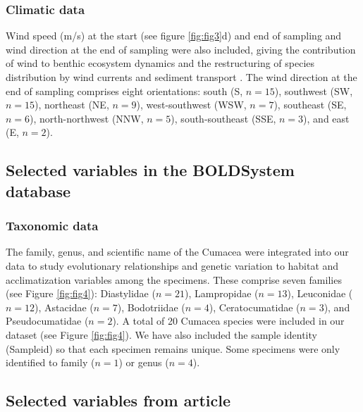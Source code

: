 {\subsubsection{Climatic data}
Wind speed (m/s) at the start (see figure \ref{fig:fig3}d) and end of sampling and wind direction at the end of sampling were also included, giving the contribution of wind to benthic ecosystem dynamics and the restructuring of species distribution by wind currents and sediment transport \citep{siedlecki2016experiments, waga_recent_2020,saeedi_environmental_2022}. The wind direction at the end of sampling comprises eight orientations: south (S, $n=15$), southwest (SW, $n=15$), northeast (NE, $n=9$), west-southwest (WSW, $n=7$), southeast (SE, $n=6$), north-northwest (NNW, $n=5$), south-southeast (SSE, $n=3$), and east (E, $n=2$).

\subsection{Selected variables in the BOLDSystem database}
\subsubsection{Taxonomic data}
The family, genus, and scientific name of the Cumacea were integrated into our data to study evolutionary relationships and genetic variation to habitat and acclimatization variables among the specimens. These comprise seven families (see Figure \ref{fig:fig4}): Diastylidae ($n=21$), Lampropidae ($n=13$), Leuconidae ($n=12$), Astacidae ($n=7$), Bodotriidae ($n=4$), Ceratocumatidae ($n=3$), and Pseudocumatidae ($n=2$). A total of 20 Cumacea species were included in our dataset (see Figure \ref{fig:fig4}). We have also included the sample identity (Sampleid) so that each specimen remains unique. Some specimens were only identified to family ($n=1$) or genus ($n=4$).

\subsection{Selected variables from article \cite{uhlir_adding_2021}}
}
